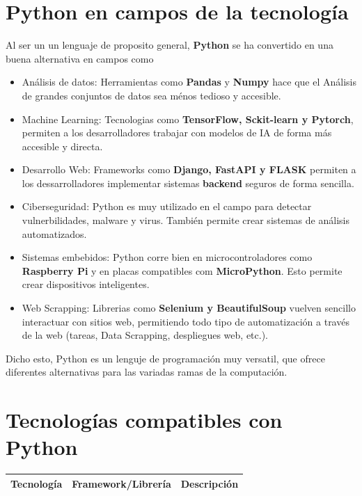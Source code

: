 \documentclass[a4paper,10pt]{article}
\begin{document}
\section*{Python en  campos de la tecnología}
Al ser un un lenguaje de proposito general, \textbf{Python}
se ha convertido en una buena alternativa en campos como
    \begin{itemize}
        \item Análisis de datos: Herramientas como \textbf{Pandas} y \textbf{Numpy} 
        hace que el Análisis de grandes conjuntos de datos sea ménos tedioso y accesible.
        \item Machine Learning: Tecnologias como \textbf{TensorFlow, Sckit-learn y Pytorch},
        permiten a los desarrolladores trabajar con modelos de IA de forma más accesible y directa.
        \item Desarrollo Web: Frameworks como \textbf{Django, FastAPI y FLASK} permiten a los dessarrolladores
        implementar sistemas \textbf{backend} seguros de forma sencilla.
        \item Ciberseguridad: Python es muy utilizado en el campo para detectar vulnerbilidades, malware y virus. También
        permite crear sistemas de análisis automatizados.
        \item Sistemas embebidos: Python corre bien en microcontroladores como \textbf{Raspberry Pi} y
        en placas compatibles com \textbf{MicroPython}. Esto permite crear dispositivos inteligentes.
        \item Web Scrapping: Librerias como \textbf{Selenium y BeautifulSoup} vuelven sencillo interactuar con 
        sitios web, permitiendo todo tipo de automatización a través de la web (tareas, Data Scrapping, despliegues web, etc.).
    \end{itemize}

Dicho esto, Python es un lenguje de programación muy versatil, que ofrece diferentes alternativas para las variadas ramas de la
computación.



\section*{Tecnologías compatibles con Python}
\begin{center}
    \begin{tabular}{| c | c | c |}
        \hline
        Tecnología & Framework/Librería & Descripción \\
        \hline\hline
    \end{tabular}
\end{center}
\end{document}
